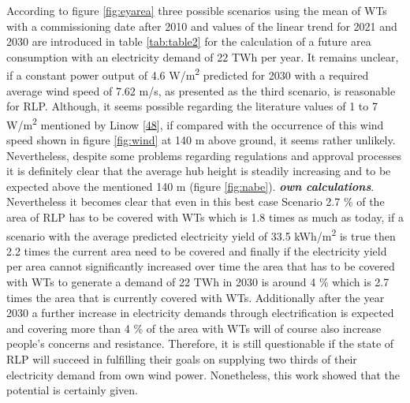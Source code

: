 \documentclass[a4paper,11pt]{article}
\begin{document}
According to figure \ref{fig:eyarea} three possible scenarios using the mean of WTs with a commissioning date after 2010 and values of the linear trend for 2021 and 2030 are introduced in table \ref{tab:table2} for the calculation of a future area consumption with an electricity demand of 22 TWh per year. It remains unclear, if a constant power output of 4.6 W/m\textsuperscript{2} predicted for 2030 with a required average wind speed of 7.62 m/s, as presented as the third scenario, is reasonable for RLP. Although, it seems possible regarding the literature values of 1 to 7 W/m\textsuperscript{2} mentioned by Linow {[}\protect\hyperlink{ref-SvenLinow.2020}{48}{]}, if compared with the occurrence of this wind speed shown in figure \ref{fig:wind} at 140 m above ground, it seems rather unlikely. Nevertheless, despite some problems regarding regulations and approval processes it is definitely clear that the average hub height is steadily increasing and to be expected above the mentioned 140 m (figure \ref{fig:nabe}). \textbf{\emph{own calculations}}. Nevertheless it becomes clear that even in this best case Scenario 2.7 \% of the area of RLP has to be covered with WTs which is 1.8 times as much as today, if a scenario with the average predicted electricity yield of 33.5 kWh/m\textsuperscript{2} is true then 2.2 times the current area need to be covered and finally if the electricity yield per area cannot significantly increased over time the area that has to be covered with WTs to generate a demand of 22 TWh in 2030 is around 4 \% which is 2.7 times the area that is currently covered with WTs. Additionally after the year 2030 a further increase in electricity demands through electrification is expected and covering more than 4 \% of the area with WTs will of course also increase people's concerns and resistance. Therefore, it is still questionable if the state of RLP will succeed in fulfilling their goals on supplying two thirds of their electricity demand from own wind power. Nonetheless, this work showed that the potential is certainly given.
\end{document}
